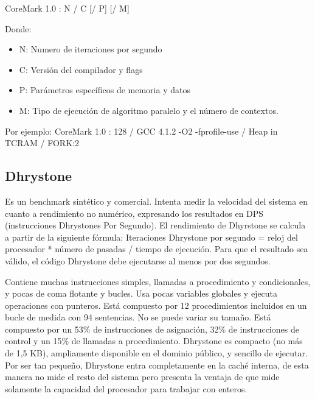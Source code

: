 CoreMark 1.0 : N / C [/ P] [/ M]
	
Donde:
\begin{itemize}
\item N: Numero de iteraciones por segundo 
\item C: Versión del compilador y flags
\item P: Parámetros específicos de memoria y datos
\item M: Tipo de ejecución de algoritmo paralelo y el número de contextos.
\end{itemize}	 
	
Por ejemplo: CoreMark 1.0 : 128 / GCC 4.1.2 -O2 -fprofile-use / Heap
in TCRAM / FORK:2
	
\subsection{Dhrystone}

 		Es un benchmark sintético y comercial. Intenta medir la velocidad del sistema en cuanto a rendimiento no numérico, expresando los
		resultados en DPS (instrucciones Dhrystones Por Segundo). El rendimiento de Dhyrstone se calcula a partir de la siguiente fórmula: Iteraciones
		Dhrystone por segundo = reloj del procesador * número de pasadas / tiempo de ejecución. Para que el resultado sea válido, el código Dhrystone debe
		ejecutarse al menos por dos segundos. %
		
		Contiene muchas instrucciones simples, llamadas a procedimiento y condicionales, y pocas de coma flotante y bucles. Usa pocas variables globales y
		ejecuta operaciones con punteros. Está compuesto por 12 procedimientos incluidos en un bucle de medida con 94 sentencias. No se puede variar su
		tamaño. Está compuesto por un 53\% de instrucciones de asignación, 32\% de instrucciones de control y un 15\% de llamadas a procedimiento.
		Dhrystone es compacto (no más de 1,5 KB), ampliamente disponible en el dominio público, y sencillo de ejecutar. Por ser tan pequeño, Dhrystone
		entra completamente en la caché interna, de esta manera no mide el resto del sistema pero presenta la ventaja de que mide solamente la capacidad
		del procesador para trabajar con enteros.
		

